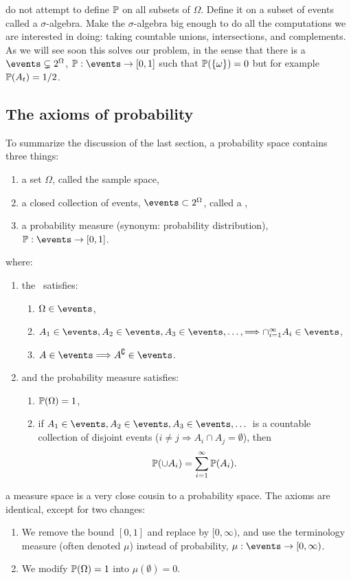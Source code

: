 \documentclass{article}
\begin{document}
 do not attempt to define $\P$ on all subsets of $\Omega$. Define it on a subset of events called a $\sigma$-algebra. Make the $\sigma$-algebra big enough to do all the computations we are interested in doing: taking countable unions, intersections, and complements. As we will see soon this solves our problem, in the sense that there is a $\events \subsetneq 2^\Omega$, $\P : \events \to [0, 1]$ such that $\P(\{\omega\}) = 0$ but for example $\P(A_t) = 1/2$.

 
\subsection{The axioms of probability} 

To summarize the discussion of the last section, a probability space contains three things:
\begin{enumerate}
  \item a set $\Omega$, called the sample space,
  \item a closed collection of events, $\events \subset 2^\Omega$, called a \sigmaalg,
  \item a probability measure (synonym: probability distribution), $\P : \events \to [0, 1]$.
\end{enumerate}
where:
\begin{enumerate}
  \item the \sigmaalg\ satisfies:
  \begin{enumerate}
    \item $\Omega \in \events$,
    \item $A_1 \in \events, A_2 \in \events, A_3 \in \events, \dots, \Longrightarrow \cap_{i=1}^\infty A_i \in \events$,
    \item $A \in \events \Longrightarrow A^\complement \in \events$.
  \end{enumerate} 
  \item and the probability measure satisfies:
  \begin{enumerate}
    \item $\P(\Omega) = 1$,
    \item if $A_1 \in \events, A_2 \in \events, A_3 \in \events, \dots$ is a countable collection of disjoint events ($i\neq j \Longrightarrow A_i \cap A_j = \emptyset$), then 
    \[ \P(\cup A_i) = \sum_{i=1}^{\infty} \P(A_i). \]
  \end{enumerate}
\end{enumerate}

 a measure space is a very close cousin to a probability space. The axioms are identical, except for two changes:
\begin{enumerate}
	\item We remove the bound $[0, 1]$ and replace by $[0, \infty)$, and use the terminology measure (often denoted $\mu$) instead of probability, $\mu : \events \to [0, \infty)$.
	\item We modify $\P(\Omega) = 1$ into $\mu(\emptyset) = 0$. 
\end{enumerate}
\end{document}
